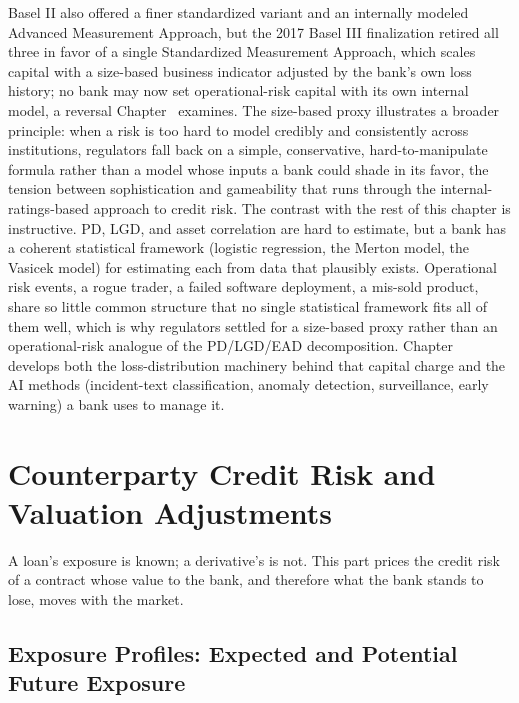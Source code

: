 \documentclass[../ai_in_finance]{subfiles}
\begin{document}
Basel II also offered a finer standardized variant and an internally modeled Advanced Measurement Approach, but the 2017 Basel III finalization retired all three in favor of a single Standardized Measurement Approach, which scales capital with a size-based business indicator adjusted by the bank's own loss history; no bank may now set operational-risk capital with its own internal model, a reversal Chapter~ examines. The size-based proxy illustrates a broader principle: when a risk is too hard to model credibly and consistently across institutions, regulators fall back on a simple, conservative, hard-to-manipulate formula rather than a model whose inputs a bank could shade in its favor, the tension between sophistication and gameability that runs through the internal-ratings-based approach to credit risk.
The contrast with the rest of this chapter is instructive. PD, LGD, and asset correlation are hard to estimate, but a bank has a coherent statistical framework (logistic regression, the Merton model, the Vasicek model) for estimating each from data that plausibly exists.
Operational risk events, a rogue trader, a failed software deployment, a mis-sold product, share so little common structure that no single statistical framework fits all of them well, which is why regulators settled for a size-based proxy rather than an operational-risk analogue of the PD/LGD/EAD decomposition. Chapter~ develops both the loss-distribution machinery behind that capital charge and the AI methods (incident-text classification, anomaly detection, surveillance, early warning) a bank uses to manage it.

\section{Counterparty Credit Risk and Valuation Adjustments}
\label{sec:ccr}

A loan's exposure is known; a derivative's is not. This part prices the credit risk of a contract whose value to the bank, and therefore what the bank stands to lose, moves with the market.

\subsection{Exposure Profiles: Expected and Potential Future Exposure}
\label{sec:exposure-profiles}
\end{document}
